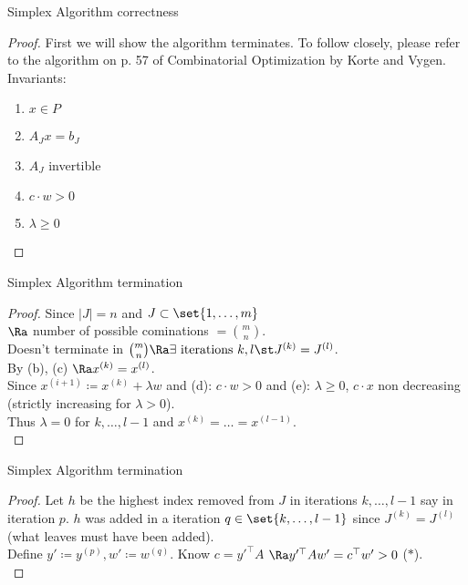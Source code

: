 \documentclass[a4paper, x11names, svgnames]{beamer}
\theoremstyle{definition}
\theoremstyle{plain}
\theoremstyle{plain}
\begin{document}
\begin{frame}{Simplex Algorithm correctness}
    \begin{proof}
        First we will show the algorithm terminates.
        To follow closely, please refer to the algorithm on p. 57 of Combinatorial Optimization by Korte and Vygen. \\ %
        Invariants:
        \renewcommand{\theenumi}{(\alph{enumi})}
        \begin{multicols}{3}
        \begin{enumerate}  %
            \item $x \in P$
            \item $A_J x = b_J$
            \item $A_J$ invertible
            \item $c\cdot w > 0$
            \item $\lambda \geq 0$
        \end{enumerate}
        \end{multicols}

    \end{proof}  %
\end{frame}


\linespread{1.5}
\begin{frame}{Simplex Algorithm termination}
    \begin{proof}
        Since $|J| = n$ and $J\subset\set{1,\dots, m}$ \\ $\Ra$ number of possible cominations $=\binom{m}{n}$. \\
        Doesn't terminate in $\binom{m}{n} \Ra \exists \text{ iterations } k, l\st J^{(k)}=J^{(l)}$. \\
        By (b), (c) $\Ra x^{(k)}=x^{(l)}$. \\
        Since $x^{(i+1)}\coloneqq x^{(k)}+\lambda w$ and (d): $c\cdot w > 0$ and (e): $\lambda \geq 0$, $c\cdot x$ non decreasing (strictly increasing for $\lambda > 0$). \\
        Thus $\lambda = 0$ for $k, \dots, l-1$ and $x^{(k)} = \dots = x^{(l-1)}$. \\
    \end{proof}
\end{frame}

\begin{frame}{Simplex Algorithm termination}
    \begin{proof}
        Let $h$ be the highest index removed from $J$ in iterations $k, \dots, l-1$ say in iteration $p$.
        $h$ was added in a iteration $q \in \set{k, \dots, l-1}$ since $J^{(k)}=J^{(l)}$ (what leaves must have been added). \\
        Define $y'\coloneqq y^{(p)}, w'\coloneqq w^{(q)}$.
        Know $c=y'^\top A$ $\Ra y'^\top A w' = c^\top w' > 0$ ($*$). \\
    \end{proof}
\end{frame}
\end{document}
